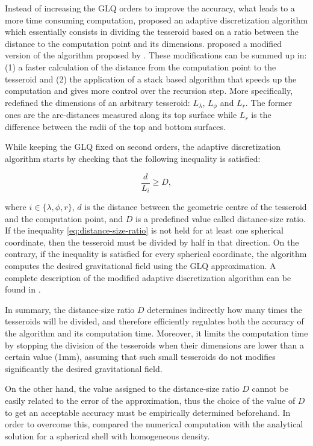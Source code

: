 \documentclass[extra]{gji}
\begin{document}
Instead of increasing the GLQ orders to improve the accuracy, what 
leads to a more time consuming computation, \citet{Li2011} proposed an 
adaptive discretization algorithm which essentially consists in 
dividing the tesseroid based on a ratio between the distance to the 
computation point and its dimensions.
\citet{Uieda2016} proposed a modified version of the algorithm proposed 
by \citet{Li2011}. These modifications can be summed up in:
(1) a faster calculation of the distance from the computation point to 
the tesseroid and 
(2) the application of a stack based algorithm that speeds up the 
computation and gives more control over the recursion step.
More specifically, \citet{Uieda2016} redefined the dimensions of an 
arbitrary tesseroid: $L_\lambda$, $L_\phi$ and $L_r$. The former ones 
are the arc-distances measured along its top surface while $L_r$ is the 
difference between the radii of the top and bottom surfaces.

While keeping the GLQ fixed on second orders, the adaptive 
discretization algorithm starts by checking that the following 
inequality is satisfied:

\begin{equation}
    \frac{d}{L_i} \geq D,
\label{eq:distance-size-ratio}
\end{equation}

\noindent where $i \in \{\lambda, \phi, r\}$, $d$ is the distance 
between the geometric centre of the tesseroid and the computation 
point, and $D$ is a predefined value called distance-size ratio.
If the inequality \ref{eq:distance-size-ratio} is not held for at least 
one spherical coordinate, then the tesseroid must be divided by half in 
that direction.
On the contrary, if the inequality is satisfied for every spherical 
coordinate, the algorithm computes the desired gravitational field using the 
GLQ approximation.
A complete description of the modified adaptive discretization 
algorithm can be found in \citet{Uieda2016}.

In summary, the distance-size ratio $D$ determines indirectly how many 
times the tesseroids will be divided, and therefore efficiently 
regulates both the accuracy of the algorithm and its computation time.
Moreover, it limits the computation time by stopping the division of 
the tesseroids when their dimensions are lower than a certain value 
(1mm), assuming that such small tesseroids do not modifies 
significantly the desired gravitational field.

On the other hand, the value assigned to the distance-size ratio $D$ 
cannot be easily related to the error of the approximation, thus the 
choice of the value of $D$ to get an acceptable accuracy must be 
empirically determined beforehand.
In order to overcome this, \citet{Uieda2016} compared the numerical 
computation with the analytical solution for a spherical shell with 
homogeneous density.
\end{document}
